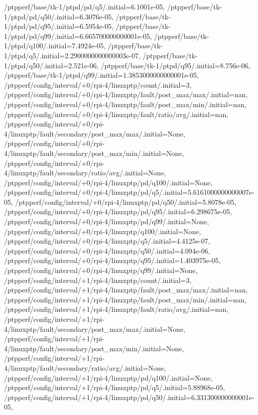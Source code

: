 {    /ptpperf/base/tk-1/ptpd/pd/q5/.initial=6.1001e-05,
    /ptpperf/base/tk-1/ptpd/pd/q50/.initial=6.3076e-05,
    /ptpperf/base/tk-1/ptpd/pd/q95/.initial=6.5954e-05,
    /ptpperf/base/tk-1/ptpd/pd/q99/.initial=6.665700000000001e-05,
    /ptpperf/base/tk-1/ptpd/q100/.initial=7.4924e-05,
    /ptpperf/base/tk-1/ptpd/q5/.initial=2.2900000000000003e-07,
    /ptpperf/base/tk-1/ptpd/q50/.initial=2.521e-06,
    /ptpperf/base/tk-1/ptpd/q95/.initial=8.756e-06,
    /ptpperf/base/tk-1/ptpd/q99/.initial=1.3853000000000001e-05,
    /ptpperf/config/interval/+0/rpi-4/linuxptp/count/.initial=3,
    /ptpperf/config/interval/+0/rpi-4/linuxptp/fault/post_max/max/.initial=nan,
    /ptpperf/config/interval/+0/rpi-4/linuxptp/fault/post_max/min/.initial=nan,
    /ptpperf/config/interval/+0/rpi-4/linuxptp/fault/ratio/avg/.initial=nan,
    /ptpperf/config/interval/+0/rpi-4/linuxptp/fault/secondary/post_max/max/.initial=None,
    /ptpperf/config/interval/+0/rpi-4/linuxptp/fault/secondary/post_max/min/.initial=None,
    /ptpperf/config/interval/+0/rpi-4/linuxptp/fault/secondary/ratio/avg/.initial=None,
    /ptpperf/config/interval/+0/rpi-4/linuxptp/pd/q100/.initial=None,
    /ptpperf/config/interval/+0/rpi-4/linuxptp/pd/q5/.initial=5.6161000000000007e-05,
    /ptpperf/config/interval/+0/rpi-4/linuxptp/pd/q50/.initial=5.8078e-05,
    /ptpperf/config/interval/+0/rpi-4/linuxptp/pd/q95/.initial=6.298675e-05,
    /ptpperf/config/interval/+0/rpi-4/linuxptp/pd/q99/.initial=None,
    /ptpperf/config/interval/+0/rpi-4/linuxptp/q100/.initial=None,
    /ptpperf/config/interval/+0/rpi-4/linuxptp/q5/.initial=4.4125e-07,
    /ptpperf/config/interval/+0/rpi-4/linuxptp/q50/.initial=4.094e-06,
    /ptpperf/config/interval/+0/rpi-4/linuxptp/q95/.initial=1.403975e-05,
    /ptpperf/config/interval/+0/rpi-4/linuxptp/q99/.initial=None,
    /ptpperf/config/interval/+1/rpi-4/linuxptp/count/.initial=3,
    /ptpperf/config/interval/+1/rpi-4/linuxptp/fault/post_max/max/.initial=nan,
    /ptpperf/config/interval/+1/rpi-4/linuxptp/fault/post_max/min/.initial=nan,
    /ptpperf/config/interval/+1/rpi-4/linuxptp/fault/ratio/avg/.initial=nan,
    /ptpperf/config/interval/+1/rpi-4/linuxptp/fault/secondary/post_max/max/.initial=None,
    /ptpperf/config/interval/+1/rpi-4/linuxptp/fault/secondary/post_max/min/.initial=None,
    /ptpperf/config/interval/+1/rpi-4/linuxptp/fault/secondary/ratio/avg/.initial=None,
    /ptpperf/config/interval/+1/rpi-4/linuxptp/pd/q100/.initial=None,
    /ptpperf/config/interval/+1/rpi-4/linuxptp/pd/q5/.initial=5.88968e-05,
    /ptpperf/config/interval/+1/rpi-4/linuxptp/pd/q50/.initial=6.331300000000001e-05,
}

